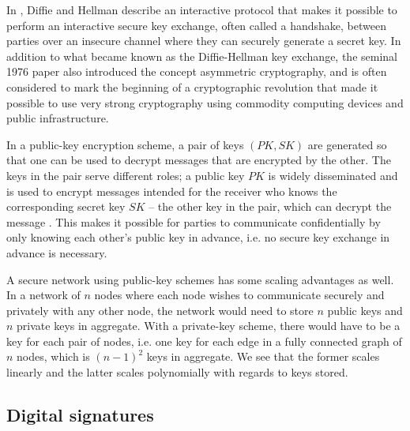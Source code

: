 In \cite{diffie1976new}, Diffie and Hellman describe an interactive protocol that makes it possible to perform an interactive secure key exchange, often called a handshake, between parties over an insecure channel where they can securely generate a secret key. In addition to what became known as the Diffie-Hellman key exchange, the seminal 1976 paper also introduced the concept asymmetric cryptography, and is often considered to mark the beginning of a cryptographic revolution that made it possible to use very strong cryptography using commodity computing devices and public infrastructure. 

In a public-key encryption scheme, a pair of keys $(PK, SK)$ are generated so that one can be used to decrypt messages that are encrypted by the other. The keys in the pair serve different roles; a public key $PK$ is widely disseminated and is used to encrypt messages intended for the receiver who knows the corresponding secret key $SK$ – the other key in the pair, which can decrypt the message \cite[p.~370]{lindell2014introduction}. This makes it possible for parties to communicate confidentially by only knowing each other's public key in advance, i.e. no secure key exchange in advance is necessary. 

A secure network using public-key schemes has some scaling advantages as well. In a network of $n$ nodes where each node wishes to communicate securely and privately with any other node, the network would need to store $n$ public keys and $n$ private keys in aggregate. With a private-key scheme, there would have to be a key for each pair of nodes, i.e. one key for each edge in a fully connected graph of $n$ nodes, which is $(n-1)^2$ keys in aggregate. We see that the former scales linearly and the latter scales polynomially with regards to keys stored. 

\subsection{Digital signatures}


